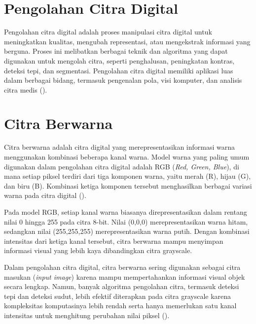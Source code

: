 \section{Pengolahan Citra Digital}
  Pengolahan citra digital adalah proses manipulasi citra digital untuk meningkatkan kualitas, mengubah representasi, atau mengekstrak informasi yang berguna. Proses ini melibatkan berbagai teknik dan algoritma yang dapat digunakan untuk mengolah citra, seperti penghalusan, peningkatan kontras, deteksi tepi, dan segmentasi. Pengolahan citra digital memiliki aplikasi luas dalam berbagai bidang, termasuk pengenalan pola, visi komputer, dan analisis citra medis (\cite{Gonzalez2018}). 




\section{Citra Berwarna}
Citra berwarna adalah citra digital yang merepresentasikan informasi warna menggunakan kombinasi beberapa kanal warna. 
Model warna yang paling umum digunakan dalam pengolahan citra digital adalah RGB (\emph{Red, Green, Blue}), di mana setiap piksel terdiri dari tiga komponen warna, yaitu merah (R), hijau (G), dan biru (B). 
Kombinasi ketiga komponen tersebut menghasilkan berbagai variasi warna pada citra digital (\cite{Gonzalez2018}).

Pada model RGB, setiap kanal warna biasanya direpresentasikan dalam rentang nilai 0 hingga 255 pada citra 8-bit.
Nilai (0,0,0) merepresentasikan warna hitam, sedangkan nilai (255,255,255) merepresentasikan warna putih. Dengan kombinasi intensitas dari ketiga kanal tersebut, citra berwarna mampu menyimpan informasi visual yang lebih kaya dibandingkan citra grayscale.

Dalam pengolahan citra digital, citra berwarna sering digunakan sebagai citra masukan (\emph{input image}) karena mampu mempertahankan informasi visual objek secara lengkap.
Namun, banyak algoritma pengolahan citra, termasuk deteksi tepi dan deteksi sudut, lebih efektif diterapkan pada citra grayscale karena kompleksitas komputasinya lebih rendah serta hanya memerlukan satu kanal intensitas untuk menghitung perubahan nilai piksel (\cite{Sanchez2018}).

